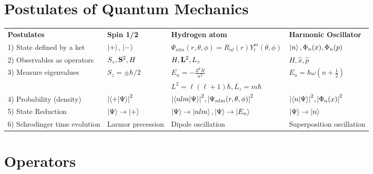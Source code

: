 \documentclass{article}
\begin{document}
\section{Postulates of Quantum Mechanics}
\begin{center}

  \begin{tabular}{l l l l}
    \hline
    \textbf{Postulates}           & \textbf{Spin 1/2}           & \textbf{Hydrogen atom}                                           & \textbf{Harmonic Oscillator}                     \\[10pt]
    1) State defined by a ket     & $\ket{+}$, $\ket{-}$        & $\Psi_{nlm}(r,\theta,\phi) = R_{nl}(r)Y^{m}_{l}(\theta, \phi)$   & $\ket{n}, \Phi_{n}(x), \Phi_{n}(p)$              \\[10pt]
    2) Observables as operators   & $S_z, \vb{S}^2, H$          & $H, \vb{L}^2, L_{z}$                                             & $H, \hat{x}, \hat{p}$                            \\[10pt]
    3) Measure eigenvalues        & $S_z = \pm \hbar/2$         & $E_n = -\frac{Z^2 R}{n^2}$                                       & $E_n = \hbar \omega ( n + \frac{1}{2})$          \\[10pt]
                                  &                             & $L^2 = \ell(\ell+1)\hbar, L_z = m\hbar$                          &                                                  \\[10pt]
    4) Probability (density)      & $\abs{\braket{+ | \Psi}}^2$ & $\abs{\braket{nlm | \Psi}}^2, \abs{\Psi_{nlm}(r,\theta,\phi)}^2$ & $\abs{\braket{n | \Psi}}^2, \abs{\Phi_{n}(x)}^2$ \\[10pt]
    5) State Reduction            & $\ket{\Psi} \to \ket{+}$    & $\ket{\Psi} \to \ket{nlm}, \ket{\Psi} \to \ket{E_n}$             & $\ket{\Psi} \to \ket{n}$                         \\[10pt]
    6) Schrodinger time evolution & Larmor precession           & Dipole oscillation                                               & Superposition oscillation                        \\[10pt]
    \hline
  \end{tabular}

\end{center}

\section{Operators}
\end{document}
